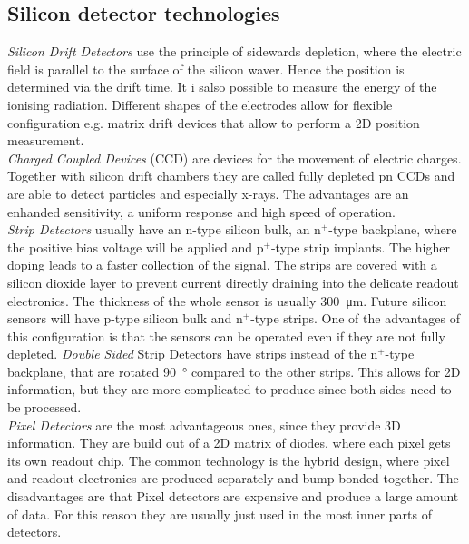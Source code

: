 \subsection{Silicon detector technologies}
\textit{Silicon Drift Detectors} use the principle of sidewards depletion, where the electric field is parallel to the surface of the silicon waver. Hence the position is determined via the drift time. It i salso possible to measure the energy of the ionising radiation. Different shapes of the electrodes allow for flexible configuration e.g. matrix drift devices that allow to perform a 2D position measurement.\\
\textit{Charged Coupled Devices} (CCD) are devices for the movement of electric charges. Together with silicon drift chambers they are called fully depleted pn CCDs and are able to detect particles and especially x-rays. The advantages are an enhanded sensitivity, a uniform response and high speed of operation.\\
\textit{Strip Detectors} usually have an n-type silicon bulk, an $\text{n}^+$-type backplane, where the positive bias voltage will be applied and $\text{p}^+$-type strip implants. The higher doping leads to a faster collection of the signal. The strips are covered with a silicon dioxide layer to prevent current directly draining into the delicate readout electronics. The thickness of the whole sensor is usually \SI{300}{\micro\meter}. Future silicon sensors will have p-type silicon bulk and $\text{n}^+$-type strips. One of the advantages of this configuration is that the sensors can be operated even if they are not fully depleted. \textit{Double Sided} Strip Detectors have strips instead of the $\text{n}^+$-type backplane, that are rotated \SI{90}{\degree} compared to the other strips. This allows for 2D information, but they are more complicated to produce since both sides need to be processed.\\
\textit{Pixel Detectors} are the most advantageous ones, since they provide 3D information. They are build out of a 2D matrix of diodes, where each pixel gets its own readout chip. The common technology is the hybrid design, where pixel and readout electronics are produced separately and bump bonded together. The disadvantages are that Pixel detectors are expensive and produce a large amount of data. For this reason they are usually just used in the most inner parts of detectors.
